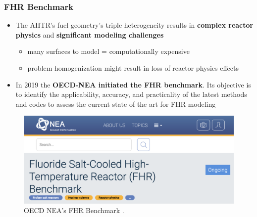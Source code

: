     \begin{frame}
    \frametitle{FHR Benchmark}
    \begin{itemize}
        \item The AHTR's fuel geometry's triple heterogeneity results in
        \textbf{complex reactor physics} and \textbf{significant modeling challenges}
        \begin{itemize}
            \item many surfaces to model = computationally expensive 
            \item problem homogenization might result in loss of reactor physics effects 
        \end{itemize}
        \item In 2019 the \textbf{OECD-NEA initiated the FHR benchmark}. Its objective 
        is to identify the applicability, accuracy, and practicality of the latest 
        methods and codes to assess the current state of the art for FHR modeling
    \end{itemize}
    \begin{figure}[]
        \includegraphics[width=0.55\linewidth]{figures/benchmark.png} 
        \caption{OECD NEA's FHR Benchmark \cite{petrovic_benchmark_2021}.}
    \end{figure}
    \end{frame}

